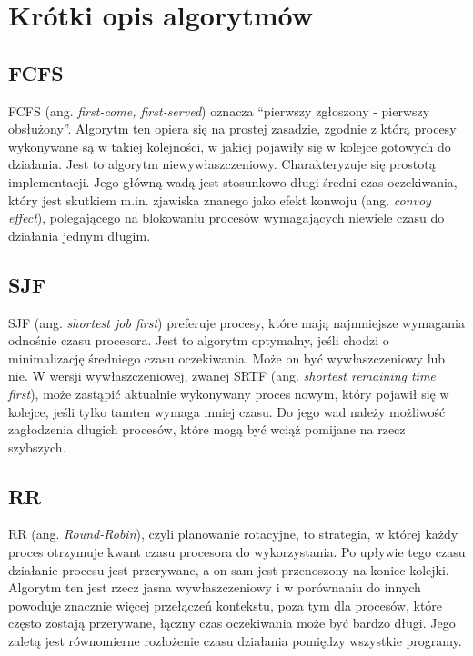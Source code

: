 \documentclass{article}
\begin{document}
\section{Krótki opis algorytmów}

\subsection{FCFS}

FCFS (ang. \textit{first-come, first-served}) oznacza ``pierwszy zgłoszony - pierwszy obsłużony''. Algorytm ten opiera się na prostej zasadzie, zgodnie z którą procesy wykonywane są w takiej kolejności, w jakiej pojawiły się w kolejce gotowych do działania. Jest to algorytm niewywłaszczeniowy. Charakteryzuje się prostotą implementacji. Jego główną wadą jest stosunkowo długi średni czas oczekiwania, który jest skutkiem m.in. zjawiska znanego jako efekt konwoju (ang. \textit{convoy effect}), polegającego na blokowaniu procesów wymagających niewiele czasu do działania jednym długim.

\subsection{SJF}

SJF (ang. \textit{shortest job first}) preferuje procesy, które mają najmniejsze wymagania odnośnie czasu procesora. Jest to algorytm optymalny, jeśli chodzi o minimalizację średniego czasu oczekiwania. Może on być wywłaszczeniowy lub nie. W wersji wywłaszczeniowej, zwanej SRTF (ang. \textit{shortest remaining time first}), może zastąpić aktualnie wykonywany proces nowym, który pojawił się w kolejce, jeśli tylko tamten wymaga mniej czasu. Do jego wad należy możliwość zagłodzenia długich procesów, które mogą być wciąż pomijane na rzecz szybszych.

\subsection{RR}

RR (ang. \textit{Round-Robin}), czyli planowanie rotacyjne, to strategia, w której każdy proces otrzymuje kwant czasu procesora do wykorzystania. Po upływie tego czasu działanie procesu jest przerywane, a on sam jest przenoszony na koniec kolejki. Algorytm ten jest rzecz jasna wywłaszczeniowy i w porównaniu do innych powoduje znacznie więcej przełączeń kontekstu, poza tym dla procesów, które często zostają przerywane, łączny czas oczekiwania może być bardzo długi. Jego zaletą jest równomierne rozłożenie czasu działania pomiędzy wszystkie programy.
\end{document}
